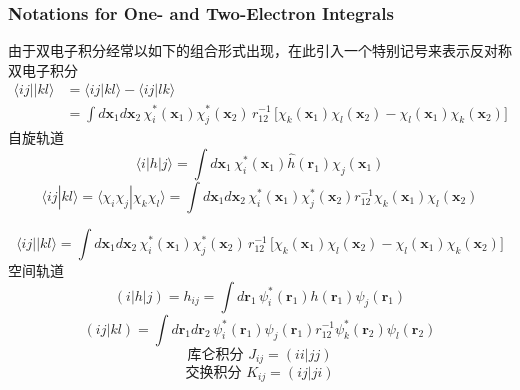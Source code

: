 \documentclass[fontset=none,12pt,a4paper]{ctexart}
\numberwithin{equation}{section}
\begin{document}
\subsubsection{Notations for One- and Two-Electron Integrals}
由于双电子积分经常以如下的组合形式出现，在此引入一个特别记号来表示反对称
双电子积分
\begin{equation}
  \begin{aligned}
    \langle ij||kl\rangle
    &= \langle ij|kl\rangle - \langle ij|lk\rangle \\[2pt]
    &= \int d\mathbf{x}_1 d\mathbf{x}_2\,
       \chi_i^*(\mathbf{x}_1)\chi_j^*(\mathbf{x}_2)\,
       r_{12}^{-1}\,
       \bigl[ \chi_k(\mathbf{x}_1)\chi_l(\mathbf{x}_2)
            - \chi_l(\mathbf{x}_1)\chi_k(\mathbf{x}_2) \bigr]
  \end{aligned}
\end{equation}
自旋轨道
\begin{equation}
  \langle i|h|j\rangle
  = \int d\mathbf{x}_1\, \chi_i^*(\mathbf{x}_1)\hat{h}(\mathbf{r}_1)\chi_j(\mathbf{x}_1)
\end{equation}
\begin{equation}
 \langle ij|kl\rangle=\langle \chi_i\chi_j|\chi_k\chi_l\rangle
=\int d\mathbf{x}_1 d\mathbf{x}_2\,\chi_i^*(\mathbf{x}_1)\chi_j^*(\mathbf{x}_2)
r_{12}^{-1} \chi_k(\mathbf{x}_1)\chi_l(\mathbf{x}_2)
\end{equation}

\begin{equation}
  \langle ij||kl\rangle
  = \int d\mathbf{x}_1 d\mathbf{x}_2\,
     \chi_i^*(\mathbf{x}_1)\chi_j^*(\mathbf{x}_2)\,
     r_{12}^{-1}\,
     \bigl[ \chi_k(\mathbf{x}_1)\chi_l(\mathbf{x}_2)
          - \chi_l(\mathbf{x}_1)\chi_k(\mathbf{x}_2) \bigr]
\end{equation}
空间轨道
\begin{equation}
 \left( i|h|j\right)=h_{ij}=\int d\mathbf{r}_1\,\psi_i^*(\mathbf{r}_1)
 h(\mathbf{r}_1)\psi_j(\mathbf{r}_1)
\end{equation}
\begin{equation}
  \left( ij|kl\right)=\int d\mathbf{r}_1 d\mathbf{r}_2\,\psi_i^*(\mathbf{r}_1)
  \psi_j(\mathbf{r}_1)r_{12}^{-1}\psi_k^*(\mathbf{r}_2)\psi_l(\mathbf{r}_2)
\end{equation}
\begin{equation}
  \text{库仑积分 } J_{ij}=\left(ii|jj\right)
\end{equation}
\begin{equation}
  \text{交换积分 } K_{ij}=\left(ij|ji\right)
\end{equation}
\end{document}

